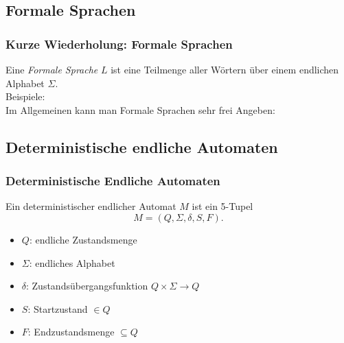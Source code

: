 \documentclass{beamer}
\begin{document}
\subsection{Formale Sprachen}
\begin{frame}
	\frametitle{Kurze Wiederholung: Formale Sprachen}
	Eine \emph{Formale Sprache} $L$ ist eine Teilmenge aller Wörtern über einem endlichen Alphabet $\Sigma$.\\[0.3cm]
	Beispiele:
	\\[0.2cm]
Im Allgemeinen kann man Formale Sprachen sehr frei Angeben: 
\end{frame}
\subsection{Deterministische endliche Automaten}
\begin{frame}
\frametitle{Deterministische Endliche Automaten}
        Ein deterministischer endlicher Automat $M$ ist ein 5-Tupel
        \[
        M= (Q,\Sigma,\delta,S,F).
        \]
        \begin{itemize}
        \item $Q$:  endliche Zustandsmenge
        \item $\Sigma$:    endliches Alphabet
        \item $\delta$:   Zustandsübergangsfunktion $Q\times \Sigma \rightarrow Q$
        \item $S$:   Startzustand $\in Q$
        \item $F$:   Endzustandsmenge $\subseteq Q$
        \end{itemize}
\end{frame}
\end{document}
